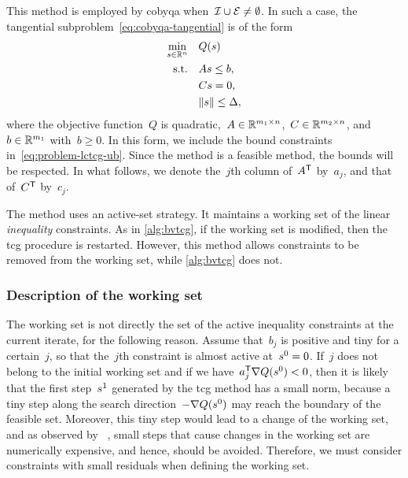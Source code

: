 This method is employed by \gls{cobyqa} when~$\mathcal{I} \cup \mathcal{E} \neq \emptyset$.
In such a case, the tangential subproblem~\cref{eq:cobyqa-tangential} is of the form
\begin{subequations}
    \label{eq:problem-lctcg}
    \begin{align}
        \min_{\sstep \in \R^n}  & \quad Q(\sstep)\\
        \text{s.t.}             & \quad A \sstep \le b, \label{eq:problem-lctcg-ub}\\
                                & \quad C \sstep = 0,\\
                                & \quad \norm{\sstep} \le \rad,
    \end{align}
\end{subequations}
where the objective function~$Q$ is quadratic,~$A \in \mathbb{R}^{m_1 \times n}$,~$C \in \mathbb{R}^{m_2 \times n}$, and~$b \in \mathbb{R}^{m_1}$ with~$b \ge 0$.
In this form, we include the bound constraints in~\cref{eq:problem-lctcg-ub}.
Since the method is a feasible method, the bounds will be respected.
In what follows, we denote the~$j$th column of~$A^{\mathsf{T}}$ by~$a_j$, and that of~$C^{\mathsf{T}}$ by~$c_j$.

The method uses an active-set strategy.
It maintains a working set of the linear \emph{inequality} constraints.
As in \cref{alg:bvtcg}, if the working set is modified, then the \gls{tcg} procedure is restarted.
However, this method allows constraints to be removed from the working set, while \cref{alg:bvtcg} does not.

\subsubsection{Description of the working set}

The working set is not directly the set of the active inequality constraints at the current iterate, for the following reason.
Assume that~$b_j$ is positive and tiny for a certain~$j$, so that the~$j$th constraint is almost active at~$\sstep[0] = 0$.
If~$j$ does not belong to the initial working set and if we have~$a_j^{\T} \nabla Q(\sstep[0]) < 0$, then it is likely that the first step~$\sstep[1]$ generated by the \gls{tcg} method has a small norm, because a tiny step along the search direction~$-\nabla Q(\sstep[0])$ may reach the boundary of the feasible set.
Moreover, this tiny step would lead to a change of the working set, and as observed by \citeauthor{Powell_2015}~\cite[\S~3]{Powell_2015}, small steps that cause changes in the working set are numerically
expensive, and hence, should be avoided.
Therefore, we must consider constraints with small residuals when defining the working set.

